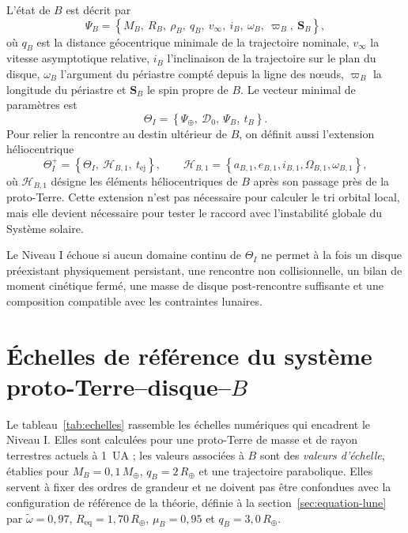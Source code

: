 \documentclass[11pt,a4paper,openany]{report}
\newcommand{\Mt}{M_{\oplus}}
\newcommand{\Rt}{R_{\oplus}}
\newcommand{\Req}{R_{\mathrm{eq}}}
\begin{document}
L'état de $B$ est décrit par
\begin{equation}
\Psi_B=\left\{M_B,\ R_B,\ \rho_B,\ q_B,\ v_\infty,\ i_B,\ \omega_B,\ \varpi_B,\ \mathbf{S}_B\right\},
\label{eq:PsiB}
\end{equation}
où $q_B$ est la distance géocentrique minimale de la trajectoire nominale, $v_\infty$ la vitesse
asymptotique relative, $i_B$ l'inclinaison de la trajectoire sur le plan du disque, $\omega_B$
l'argument du périastre compté depuis la ligne des nœuds, $\varpi_B$ la longitude du périastre et
$\mathbf{S}_B$ le spin propre de $B$. Le vecteur minimal de paramètres est
\begin{equation}
\Theta_I=\left\{\Psi_\oplus,\ \mathcal{D}_0,\ \Psi_B,\ t_B\right\}.
\label{eq:Theta}
\end{equation}
Pour relier la rencontre au destin ultérieur de $B$, on définit aussi l'extension héliocentrique
\begin{equation}
\Theta_I^{+}=\left\{\Theta_I,\ \mathcal{H}_{B,1},\ t_{\mathrm{ej}}\right\},
\qquad
\mathcal{H}_{B,1}=\left\{a_{B,1},e_{B,1},i_{B,1},\Omega_{B,1},\omega_{B,1}\right\},
\label{eq:Theta-plus}
\end{equation}
où $\mathcal{H}_{B,1}$ désigne les éléments héliocentriques de $B$ après son passage près de la
proto-Terre. Cette extension n'est pas nécessaire pour calculer le tri orbital local, mais elle devient
nécessaire pour tester le raccord avec l'instabilité globale du Système solaire.

\begin{falsif}
Le Niveau I échoue si aucun domaine continu de $\Theta_I$ ne permet à la fois un disque
préexistant physiquement persistant, une rencontre non collisionnelle, un bilan de moment
cinétique fermé, une masse de disque post-rencontre suffisante et une composition compatible
avec les contraintes lunaires.
\end{falsif}


\section{Échelles de référence du système proto-Terre--disque--\texorpdfstring{$B$}{B}}

Le tableau~\ref{tab:echelles} rassemble les échelles numériques qui encadrent le Niveau I. Elles
sont calculées pour une proto-Terre de masse et de rayon terrestres actuels à 1~UA ; les valeurs
associées à $B$ sont des \emph{valeurs d'échelle}, établies pour $M_B=0{,}1\,\Mt$, $q_B=2\,\Rt$ et
une trajectoire parabolique. Elles servent à fixer des ordres de grandeur et ne doivent pas être
confondues avec la configuration de référence de la théorie, définie à la
section~\ref{sec:equation-lune} par $\tilde\omega=0{,}97$, $\Req=1{,}70\,\Rt$, $\mu_B=0{,}95$ et
$q_B=3{,}0\,\Rt$.
\end{document}
